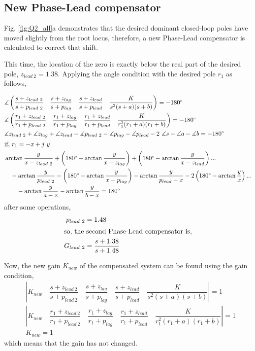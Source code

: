\documentclass[11pt, a4paper]{article}
\begin{document}
\subsection{New Phase-Lead compensator}
Fig. \ref{fig:Q2_all}a demonstrates that the desired dominant closed-loop poles have moved slightly from the root locus, therefore, a new Phase-Lead compensator is calculated to correct that shift.

This time, the location of the zero is exactly below the real part of the desired pole, $z_{lead~2}=1.38$. Applying the angle condition with the desired pole $r_1$ as follows,

\begin{align}
&\measuredangle \left( \dfrac{s+z_{lead~2}}{s+p_{lead~2}} \quad \dfrac{s+z_{lag}}{s+p_{lag}} \quad \dfrac{s+z_{lead}}{s+p_{lead}} \quad \dfrac{K}{s^2(s+a)(s+b)}  \right) = -180\degree \\
&\measuredangle \left( \dfrac{r_1+z_{lead~2}}{r_1+p_{lead~2}} \quad \dfrac{r_1+z_{lag}}{r_1+p_{lag}} \quad \dfrac{r_1+z_{lead}}{r_1+p_{lead}} \quad \dfrac{K}{r_1^2(r_1+a)(r_1+b)}  \right) = -180\degree \nonumber \\
&\measuredangle z_{lead~2} +\measuredangle z_{lag} +\measuredangle z_{lead}   -  \measuredangle p_{lead~2} -\measuredangle p_{lag} - \measuredangle p_{lead} - 2~\measuredangle s -\measuredangle a - \measuredangle b = -180\degree \nonumber\\
\intertext{if, $r_1 = -x+j~y$ }
& \arctan\dfrac{y}{x-z_{lead~2}} + \left( 180\degree - \arctan\dfrac{y}{x-z_{lag}} \right) + \left( 180\degree-\arctan\dfrac{y}{x-z_{lead}} \right) ... \nonumber\\
& \quad - \arctan\dfrac{y}{p_{lead~2}} - \left( 180\degree-\arctan\dfrac{y}{x-p_{lag}}  \right)  -\arctan\dfrac{y}{p_{lead}-x} - 2\left( 180\degree -\arctan\dfrac{y}{x} \right) ... \nonumber\\
&\qquad -\arctan\dfrac{y}{a-x}-\arctan\dfrac{y}{b-x} = 180\degree \nonumber
\end{align}
after some operations,
\begin{align}
p_{lead~2} &= 1.48 \nonumber\\
\intertext{so, the second Phase-Lead compensator is,}
G_{lead~2} &= \dfrac{s+1.38}{s+1.48} \nonumber
\end{align}

Now, the new gain $K_{new}$ of the compensated system can be found using the gain condition,
\begin{align}
&\left| K_{new} \quad \dfrac{s+z_{lead~2}}{s+p_{lead~2}} \quad \dfrac{s+z_{lag}}{s+p_{lag}} \quad \dfrac{s+z_{lead}}{s+p_{lead}} \quad \dfrac{K}{s^2(s+a)(s+b)}  \right| = 1 \\
&\left| K_{new} \quad \dfrac{r_1+z_{lead~2}}{r_1+p_{lead~2}} \quad \dfrac{r_1+z_{lag}}{r_1+p_{lag}} \quad \dfrac{r_1+z_{lead}}{r_1+p_{lead}} \quad \dfrac{K}{r_1^2(r_1+a)(r_1+b)}  \right| = 1 \nonumber\\
&K_{new} = 1 \nonumber
\end{align}
which means that the gain has not changed.
\end{document}
